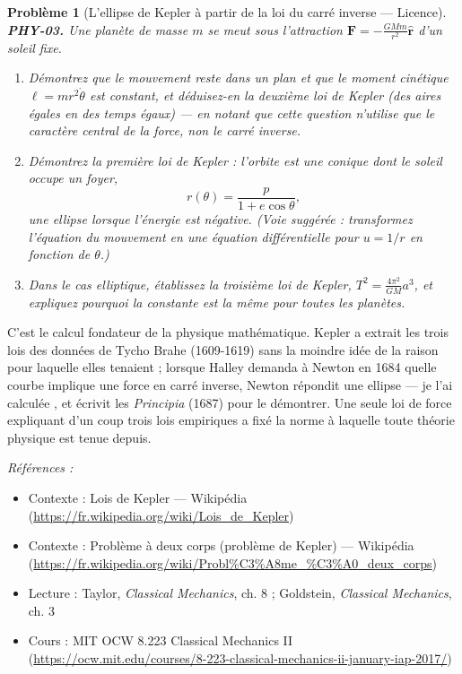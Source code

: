 \documentclass[11pt]{article}
\newtheorem{problem}{Problème}
\newenvironment{refs}{\par\small\noindent\emph{Références :}\begin{itemize}\setlength\itemsep{0pt}}{\end{itemize}\normalsize}
\begin{document}
\bigskip

\begin{problem}[{L'ellipse de Kepler à partir de la loi du carré inverse --- Licence}]
\textbf{PHY-03.} Une planète de masse $m$ se meut sous l'attraction
$\mathbf{F} = -\frac{GMm}{r^2}\hat{\mathbf{r}}$ d'un soleil fixe.
\begin{enumerate}
\item[(a)] Démontrez que le mouvement reste dans un plan et que le moment cinétique
$\ell = m r^2 \dot\theta$ est constant, et déduisez-en la deuxième loi de Kepler (des aires
égales en des temps égaux) --- en notant que cette question n'utilise que le caractère central de
la force, non le carré inverse.
\item[(b)] Démontrez la première loi de Kepler : l'orbite est une conique dont le soleil occupe un
foyer,
\[ r(\theta) = \frac{p}{1 + e\cos\theta}, \]
une ellipse lorsque l'énergie est négative. (Voie suggérée : transformez l'équation du mouvement
en une équation différentielle pour $u = 1/r$ en fonction de $\theta$.)
\item[(c)] Dans le cas elliptique, établissez la troisième loi de Kepler, $T^2 = \frac{4\pi^2}{GM}a^3$,
et expliquez pourquoi la constante est la même pour toutes les planètes.
\end{enumerate}

\end{problem}

\noindent C'est le calcul fondateur de la physique mathématique. Kepler a extrait les
trois lois des données de Tycho Brahe (1609-1619) sans la moindre idée de la raison pour laquelle
elles tenaient ; lorsque Halley demanda à Newton en 1684 quelle courbe implique une force en carré
inverse, Newton répondit \og{} une ellipse --- je l'ai calculée \fg{}, et écrivit les \textit{Principia}
(1687) pour le démontrer. Une seule loi de force expliquant d'un coup trois lois empiriques a
fixé la norme à laquelle toute théorie physique est tenue depuis.

\begin{refs}
\item Contexte : Lois de Kepler --- Wikipédia (\url{https://fr.wikipedia.org/wiki/Lois_de_Kepler})
\item Contexte : Problème à deux corps (problème de Kepler) --- Wikipédia (\url{https://fr.wikipedia.org/wiki/Probl%C3%A8me_%C3%A0_deux_corps})
\item Lecture : Taylor, \textit{Classical Mechanics}, ch. 8 ; Goldstein, \textit{Classical Mechanics}, ch. 3
\item Cours : MIT OCW 8.223 Classical Mechanics II (\url{https://ocw.mit.edu/courses/8-223-classical-mechanics-ii-january-iap-2017/})
\end{refs}
\end{document}

